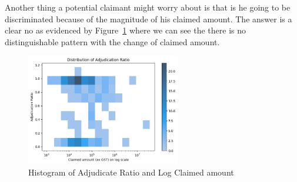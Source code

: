 \documentclass[12pt, b4paper]{article}
\begin{document}
     Another thing a potential claimant might worry about is that is he going to be discriminated because of the magnitude of his claimed amount. The answer is a clear no as evidenced by Figure~\ref{fig:AdjRatioToLogClaimAmount} where we can see the there is no distinguishable pattern with the change of claimed amount.
     \begin{figure}
      \begin{center}
        \includegraphics[width=0.6\textwidth]{plots/AdjRatioToLogClaimAmount.png}
      \end{center}
      \caption{Histogram of Adjudicate Ratio and Log Claimed amount}
      \label{fig:AdjRatioToLogClaimAmount}
     \end{figure}
     
\end{document}
